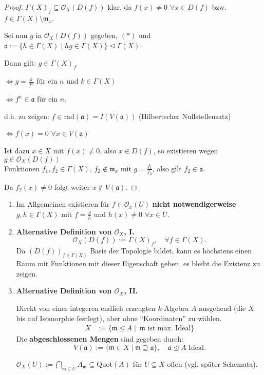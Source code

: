 \begin{proof}
  $\Gamma(X)_f\subseteq \mathcal{O}_{X}(D(f))$ klar, da $f(x)\neq0$ $\forall x\in D(f)$
  bzw. $f\in \Gamma(X)\setminus\mathfrak{m}_{x}$. 

  Sei nun $g$ in $\mathcal{O}_{X}(D(f))$ gegeben, $(*)$
  und $\mathfrak{a}:=\{h\in\Gamma(X)\mid hg\in\Gamma(X)\}\unlhd\Gamma(X)$.

  Dann gilt: $g\in\Gamma(X)_{f}$

  $\Leftrightarrow g=\frac{k}{f^{n}}$ für ein $n$ und $k\in\Gamma(X)$

  $\Leftrightarrow f^{n}\in\mathfrak{a}$ für ein $n$.

  d.h. zu zeigen: $f\in\text{rad}(\mathfrak{a})=I(V(\mathfrak{a}))$ (Hilbertscher
  Nullstellensatz)

  $\Leftrightarrow f(x)=0$ $\forall x\in V(\mathfrak{a})$

  Ist dazu $x\in X$ mit $f(x)\neq0$, also $x\in D(f)$, so
  existieren wegen $g \in \mathcal{O}_{X}(D(f))$ \\ Funktionen $f_{1},f_{2}\in\Gamma(X)$, $f_{2}\notin\mathfrak{m}_{x}$
  mit $g=\frac{f_{1}}{f_{2}}$, also gilt $f_{2}\in\mathfrak{a}$. 

  Da $f_{2}(x)\neq0$ folgt weiter $x\notin V(\mathfrak{a})$.
\end{proof}
\begin{rem}[orig. 34]
  \label{rem:globale-darstellung-von-fkt}
  \mbox{}
  \begin{enumerate}
  \item Im Allgemeinen existieren für $f\in\mathcal{O}_{x}(U)$ \textbf{nicht notwendigerweise}
    $g,h\in\Gamma(X)$ mit $f=\frac{g}{h}$ und $h(x)\neq0$ $\forall x\in U$.
  \item \textbf{Alternative Definition von $\mathcal{O}_{X}$, I.}
    \[
      \mathcal{O}_{X}(D(f)):=\Gamma(X)_{f},\quad\forall f\in\Gamma(X).
    \]
    Da $(D(f))_{f \in \Gamma(X)}$ Basis der Topologie bildet, kann es höchstens einen
    Raum mit Funktionen mit dieser Eigenschaft geben, es bleibt die Existenz
    zu zeigen.
  \item \textbf{Alternative Definition von $\mathcal{O}_{X}$, II.}

    Direkt von einer integeren endlich erzeugten $k$-Algebra $A$ ausgehend
    (die $X$ bis auf Isomorphie festlegt), aber ohne ``Koordinaten''
    zu wählen.
    \begin{align*}
      X & :=\{\mathfrak{m}\unlhd A\mid\ \mathfrak{m} \text{ ist max. Ideal}\}
    \end{align*}
    Die \textbf{abgeschlossenen Mengen} sind gegeben durch:
    \[
      V(\mathfrak{a}):=\{\mathfrak{m} \in X \mid\mathfrak{m}\supseteq\mathfrak{a}\},\quad\mathfrak{a}\unlhd A\text{ Ideal}.
    \]

    $\mathcal{O}_{X}(U):=\bigcap_{\mathfrak{m}\in U}A_{\mathfrak{m}}\subseteq\text{Quot}(A)$
    für $U\subseteq X$ offen (vgl. später Schemata).
  \end{enumerate}
\end{rem}

